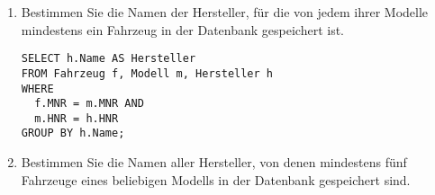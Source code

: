 \documentclass{bschlangaul-aufgabe}
\begin{document}
\begin{enumerate}

\item Bestimmen Sie die Namen der Hersteller, für die von jedem ihrer
Modelle mindestens ein Fahrzeug in der Datenbank gespeichert ist.

\begin{bAntwort}
\begin{verbatim}
SELECT h.Name AS Hersteller
FROM Fahrzeug f, Modell m, Hersteller h
WHERE
  f.MNR = m.MNR AND
  m.HNR = h.HNR
GROUP BY h.Name;
\end{verbatim}
\end{bAntwort}


\item Bestimmen Sie die Namen aller Hersteller, von denen mindestens
fünf Fahrzeuge eines beliebigen Modells in der Datenbank gespeichert
sind.
\end{enumerate}
\end{document}
